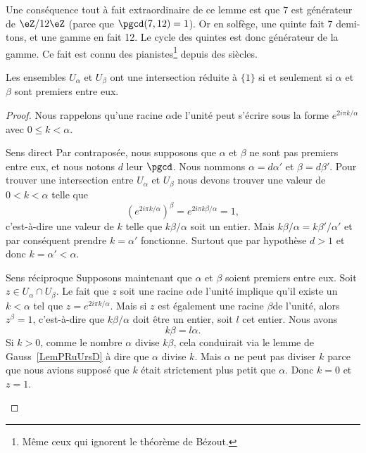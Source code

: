 \begin{example}
Une conséquence tout à fait extraordinaire de ce lemme est que \( 7\) est générateur de \( \eZ/12\eZ\) (parce que \( \pgcd(7,12)=1\)). Or en solfège, une quinte fait \( 7\) demi-tons, et une gamme en fait 12. Le cycle des quintes est donc générateur de la gamme\cite{YDXsAM}. Ce fait est connu des pianistes\footnote{Même ceux qui ignorent le théorème de Bézout.} depuis des siècles.
\end{example}

\begin{proposition}      \label{PROPooIOQEooGMcCJm}
    Les ensembles \( U_{\alpha}\) et \( U_{\beta}\) ont une intersection réduite à \( \{ 1 \}\) si et seulement si \( \alpha\) et \( \beta\) sont premiers entre eux.
\end{proposition}

\begin{proof}
    Nous rappelons qu'une racine \( \alpha\)\ieme de l'unité peut s'écrire sous la forme \(  e^{2i\pi k/\alpha}\) avec \( 0\leq k<\alpha\).
    \begin{subproof}
    \item[Sens direct]
        Par contraposée, nous supposons que \( \alpha\) et \( \beta\) ne sont pas premiers entre eux, et nous notons \( d\) leur \( \pgcd\). Nous nommons \( \alpha=d\alpha'\) et \( \beta=d\beta'\). Pour trouver une intersection entre \( U_{\alpha}\) et \( U_{\beta}\) nous devons trouver une valeur de \( 0<k<\alpha\) telle que
        \begin{equation}
            ( e^{2i\pi k/\alpha})^{\beta}= e^{2i\pi k\beta/\alpha}=1,
        \end{equation}
        c'est-à-dire une valeur de \( k\) telle que \( k\beta/\alpha\) soit un entier. Mais \( k\beta/\alpha=k\beta'/\alpha'\) et par conséquent prendre \( k=\alpha'\) fonctionne. Surtout que par hypothèse \( d>1\) et donc \( k=\alpha'<\alpha\).
    \item[Sens réciproque]
        Supposons maintenant que \( \alpha\) et \( \beta \) soient premiers entre eux. Soit \( z\in U_{\alpha}\cap U_{\beta}\). Le fait que \( z\) soit une racine \( \alpha\)\ieme de l'unité implique qu'il existe un \( k<\alpha\) tel que \( z= e^{2i\pi k/\alpha}\). Mais si \( z\) est également une racine \( \beta\)\ieme de l'unité, alors \( z^{\beta}=1\), c'est-à-dire que \( k\beta/\alpha\) doit être un entier, soit \( l\) cet entier. Nous avons
        \begin{equation}
            k\beta=l\alpha.
        \end{equation}
		Si \( k>0\), comme le nombre \( \alpha\) divise \( k\beta\), cela conduirait via le lemme de Gauss~\ref{LemPRuUrsD} à dire que \( \alpha\) divise \( k\). Mais \( \alpha\) ne peut pas diviser \( k\) parce que nous avions supposé que \( k\) était strictement plus petit que \( \alpha\). Donc \( k = 0\) et \( z = 1\).
    \end{subproof}
\end{proof}

